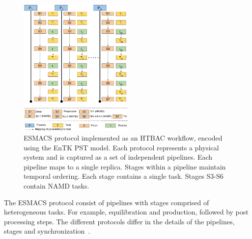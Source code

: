 \begin{figure}
\centering
  \includegraphics[width=0.5\textwidth]{FIGURES/HTBAC_Workflow_ESMACS.pdf}
  \caption{ESMACS protocol implemented as an HTBAC workflow, encoded using
  the EnTK PST model. Each protocol represents a physical system and is
  captured as a set of independent pipelines. Each pipeline maps to a single
  replica. Stages within a pipeline maintain temporal ordering. Each stage
  contains a single task. Stages S3-S6 contain NAMD
  tasks.}\label{figure:HTBAC}
\end{figure}

The ESMACS protocol consist of pipelines with stages comprised of
heterogeneous tasks. For example, equilibration and production, followed by
post processing steps. The different protocols differ in the details of the
pipelines, stages and synchronization~\cite{Bhati2017}.




